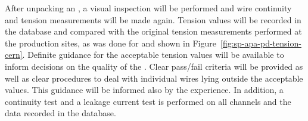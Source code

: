 After unpacking an , a visual inspection will be performed and wire continuity and tension measurements will be made again. %
Tension values will be recorded in the database and compared with the original tension measurements performed at the production sites, as was done for  and shown in Figure~\ref{fig:sp-apa-pd-tension-cern}. Definite guidance for the acceptable tension values will be available to inform decisions on the quality of the . Clear pass/fail criteria %
will be provided as well as clear procedures to deal with individual wires lying outside the acceptable values. %
This guidance will be informed also by the  experience. %
In addition, a continuity test and a leakage current test is performed on all channels and the data recorded in the database. 

